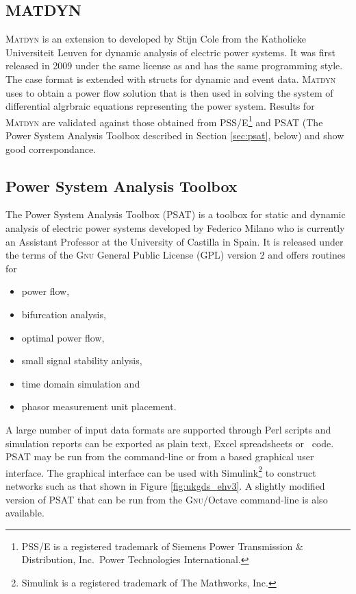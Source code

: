 \subsection*{MATDYN}
\textsc{Matdyn} is an extension to \matpower developed by Stijn Cole from the
Katholieke Universiteit Leuven for dynamic analysis of electric power systems.
It was first released in 2009 under the same license as \matpower and has the
same programming style.  The \matpower case format is extended with structs
for dynamic and event data.  \textsc{Matdyn} uses \matpower to obtain a power
flow solution that is then used in solving the system of differential
algrbraic equations representing the power system.  Results for \textsc{Matdyn}
are validated against those obtained from PSS/E\footnote{PSS/E is a
registered trademark of Siemens Power Transmission \& Distribution, Inc.~Power
Technologies International.} and PSAT (The Power System Analysis Toolbox
described in Section \ref{sec:psat}, below) and show good correspondance.

\subsection*{Power System Analysis Toolbox}
\label{sec:psat}
The Power System Analysis Toolbox (PSAT) is a \matlab toolbox for static and
dynamic analysis of electric power systems developed by Federico Milano
who is currently an Assistant Professor at the University of Castilla in Spain.
It is released under the terms of the \textsc{Gnu} General Public License (GPL)
version 2 and offers routines for
\begin{itemize}
	\item power flow,
	\item bifurcation analysis,
	\item optimal power flow,
	\item small signal stability anlysis,
	\item time domain simulation and
	\item phasor measurement unit placement.
\end{itemize}
A large number of input data formats are supported through Perl scripts and
simulation reports can be exported as plain text, Excel spreadsheets or
\LaTeXe~code.  PSAT may be run from the \matlab command-line or from a \matlab
based graphical user interface.  The graphical interface can be used with
Simulink\footnote{Simulink is a registered trademark of The Mathworks, Inc.}
to construct networks such as that shown in Figure \ref{fig:ukgds_ehv3}.  A
slightly modified version of PSAT that can be run from the \textsc{Gnu}/Octave
command-line is also available.

